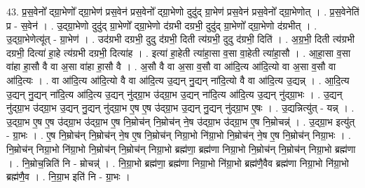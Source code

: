 \documentclass[17pt]{extarticle}
\begin{document}
43. प्र॒स॒वेनो᳚ द्ग्रा॒भेणो᳚ द्ग्रा॒भेण॑ प्रस॒वेन॑ प्रस॒वेनो᳚ द्ग्रा॒भेणो दुदु॑द् ग्रा॒भेण॑ प्रस॒वेन॑ प्रस॒वेनो᳚ द्ग्रा॒भेणोत् । . प्र॒स॒वेनेति॑ प्र - स॒वेन॑ । . उ॒द्ग्रा॒भेणो दुदु॑द् ग्रा॒भेणो᳚ द्ग्रा॒भेणो द॑ग्रभी दग्रभी॒ दुदु॑द् ग्रा॒भेणो᳚ द्ग्रा॒भेणो द॑ग्रभीत् । . उ॒द्ग्रा॒भेणेत्यू॑त् - ग्रा॒भेण॑ । . उद॑ग्रभी दग्रभी॒ दुदु द॑ग्रभी॒ दिती त्य॑ग्रभी॒ दुदु द॑ग्रभी॒ दिति॑ । . अ॒ग्र॒भी॒ दिती त्य॑ग्रभी दग्रभी॒ दित्या॑ हा॒हे त्य॑ग्रभी दग्रभी॒ दित्या॑ह । . इत्या॑ हा॒हेती त्या॑हा॒सा व॒सा वा॒हेती त्या॑हा॒सौ । . आ॒हा॒सा व॒सा वा॑हा हा॒सौ वै वा अ॒सा वा॑हा हा॒सौ वै । . अ॒सौ वै वा अ॒सा व॒सौ वा आ॑दि॒त्य आ॑दि॒त्यो वा अ॒सा व॒सौ वा आ॑दि॒त्यः । . वा आ॑दि॒त्य आ॑दि॒त्यो वै वा आ॑दि॒त्य उ॒द्यन् नु॒द्यन् ना॑दि॒त्यो वै वा आ॑दि॒त्य उ॒द्यन्न् । . आ॒दि॒त्य उ॒द्यन् नु॒द्यन् ना॑दि॒त्य आ॑दि॒त्य उ॒द्यन् नु॑द्ग्रा॒भ उ॑द्ग्रा॒भ उ॒द्यन् ना॑दि॒त्य आ॑दि॒त्य उ॒द्यन् नु॑द्ग्रा॒भः । . उ॒द्यन् नु॑द्ग्रा॒भ उ॑द्ग्रा॒भ उ॒द्यन् नु॒द्यन् नु॑द्ग्रा॒भ ए॒ष ए॒ष उ॑द्ग्रा॒भ उ॒द्यन् नु॒द्यन् नु॑द्ग्रा॒भ ए॒षः । . उ॒द्यन्नित्यु॑त् - यन्न् । . उ॒द्ग्रा॒भ ए॒ष ए॒ष उ॑द्ग्रा॒भ उ॑द्ग्रा॒भ ए॒ष नि॒म्रोच॑न् नि॒म्रोच॑न् ने॒ष उ॑द्ग्रा॒भ उ॑द्ग्रा॒भ ए॒ष नि॒म्रोचन्न्॑ । . उ॒द्ग्रा॒भ इत्यु॑त् - ग्रा॒भः । . ए॒ष नि॒म्रोच॑न् नि॒म्रोच॑न् ने॒ष ए॒ष नि॒म्रोच॑न् निग्रा॒भो नि॑ग्रा॒भो नि॒म्रोच॑न् ने॒ष ए॒ष नि॒म्रोच॑न् निग्रा॒भः । . नि॒म्रोच॑न् निग्रा॒भो नि॑ग्रा॒भो नि॒म्रोच॑न् नि॒म्रोच॑न् निग्रा॒भो ब्रह्म॑णा॒ ब्रह्म॑णा निग्रा॒भो नि॒म्रोच॑न् नि॒म्रोच॑न् निग्रा॒भो ब्रह्म॑णा । . नि॒म्रोच॒न्निति॑ नि - म्रोचन्न्॑ । . नि॒ग्रा॒भो ब्रह्म॑णा॒ ब्रह्म॑णा निग्रा॒भो नि॑ग्रा॒भो ब्रह्म॑णै॒वैव ब्रह्म॑णा निग्रा॒भो नि॑ग्रा॒भो ब्रह्म॑णै॒व । . नि॒ग्रा॒भ इति॑ नि - ग्रा॒भः । \newline
\end{document}
